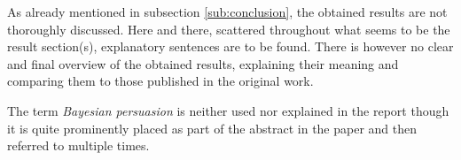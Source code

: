 \documentclass[../review.tex]{subfiles}
\begin{document}
As already mentioned in subsection \ref{sub:conclusion}, the obtained results are not thoroughly discussed. Here and there, scattered throughout what seems to be the result section(s), explanatory sentences are to be found. There is however no clear and final overview of the obtained results, explaining their meaning and comparing them to those published in the original work.

The term \textit{Bayesian persuasion} is neither used nor explained in the report though it is quite prominently placed as part of the abstract in the paper and then referred to multiple times.
\end{document}
